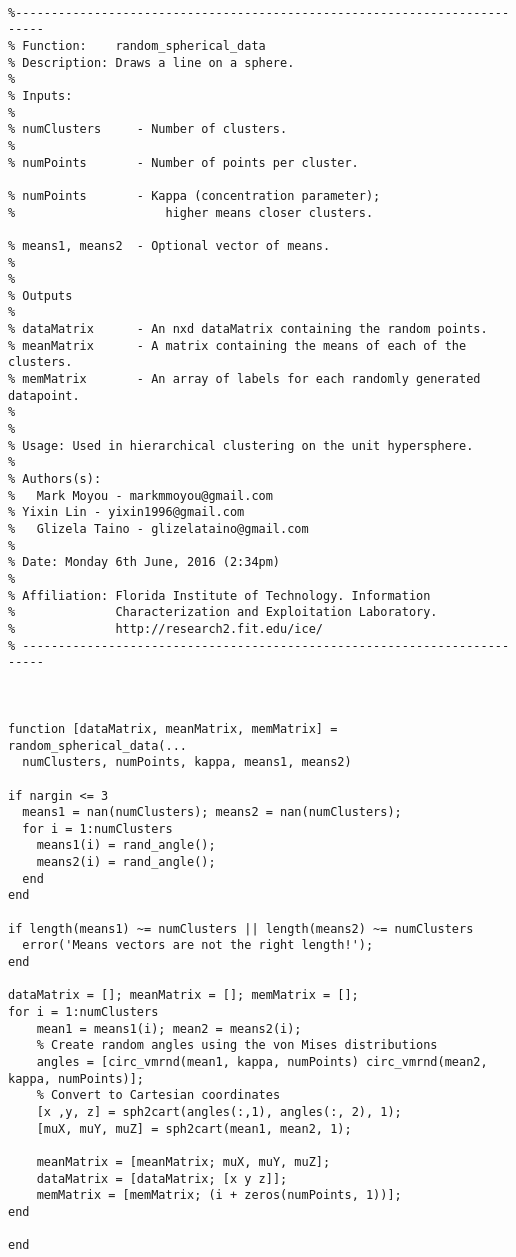 \documentclass[../tech_report_1.tex]{subfiles}
\begin{document}
\begin{verbatim}

%--------------------------------------------------------------------------
% Function:    random_spherical_data
% Description: Draws a line on a sphere.
% 
% Inputs: 
%
% numClusters     - Number of clusters.
%
% numPoints       - Number of points per cluster.

% numPoints       - Kappa (concentration parameter);
%                     higher means closer clusters.

% means1, means2  - Optional vector of means.
%
% 
% Outputs
% 
% dataMatrix      - An nxd dataMatrix containing the random points.
% meanMatrix      - A matrix containing the means of each of the clusters.
% memMatrix       - An array of labels for each randomly generated datapoint.
% 
%
% Usage: Used in hierarchical clustering on the unit hypersphere.
%
% Authors(s):
%   Mark Moyou - markmmoyou@gmail.com
% Yixin Lin - yixin1996@gmail.com
%   Glizela Taino - glizelataino@gmail.com
%
% Date: Monday 6th June, 2016 (2:34pm)
%
% Affiliation: Florida Institute of Technology. Information
%              Characterization and Exploitation Laboratory.
%              http://research2.fit.edu/ice/
% -------------------------------------------------------------------------



function [dataMatrix, meanMatrix, memMatrix] = random_spherical_data(...
  numClusters, numPoints, kappa, means1, means2)

if nargin <= 3
  means1 = nan(numClusters); means2 = nan(numClusters);
  for i = 1:numClusters
    means1(i) = rand_angle();
    means2(i) = rand_angle();
  end
end

if length(means1) ~= numClusters || length(means2) ~= numClusters
  error('Means vectors are not the right length!');
end

dataMatrix = []; meanMatrix = []; memMatrix = [];
for i = 1:numClusters
    mean1 = means1(i); mean2 = means2(i);
    % Create random angles using the von Mises distributions
    angles = [circ_vmrnd(mean1, kappa, numPoints) circ_vmrnd(mean2, kappa, numPoints)];
    % Convert to Cartesian coordinates
    [x ,y, z] = sph2cart(angles(:,1), angles(:, 2), 1);
    [muX, muY, muZ] = sph2cart(mean1, mean2, 1);

    meanMatrix = [meanMatrix; muX, muY, muZ];
    dataMatrix = [dataMatrix; [x y z]];
    memMatrix = [memMatrix; (i + zeros(numPoints, 1))];
end

end
\end{verbatim}
\end{document}
